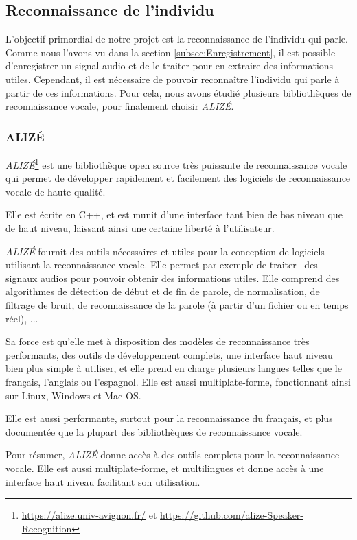 
\subsection{Reconnaissance de l'individu}
\label{subsec:Reconnaissance_individu}

L'objectif primordial de notre projet est la reconnaissance de l'individu qui parle. Comme nous l'avons vu dans la section \ref{subsec:Enregistrement}, il est
possible d'enregistrer un signal audio et de le traiter pour en extraire des informations utiles. Cependant, il est nécessaire de pouvoir reconnaître
l'individu qui parle à partir de ces informations. Pour cela, nous avons étudié plusieurs bibliothèques de reconnaissance vocale, pour finalement choisir
\textit{ALIZÉ}.


\subsubsection{ALIZÉ}
\textit{ALIZÉ}\footnote{\url{https://alize.univ-avignon.fr/} et \url{https://github.com/alize-Speaker-Recognition}} est une bibliothèque open source très
puissante de reconnaissance vocale qui permet de développer rapidement et facilement des logiciels de reconnaissance vocale de haute qualité.

Elle est écrite en C++, et est munit d'une interface tant bien de bas niveau que de haut niveau, laissant ainsi une certaine liberté à l'utilisateur.


\textit{ALIZÉ} fournit des outils nécessaires et utiles pour la conception de logiciels utilisant la reconnaissance vocale. Elle permet par exemple de traiter \
des signaux audios pour pouvoir obtenir des informations utiles. Elle comprend des algorithmes de détection de début et de fin de parole, de normalisation, de
filtrage de bruit, de reconnaissance de la parole (à partir d'un fichier ou en temps réel), ...

Sa force est qu'elle met à disposition des modèles de reconnaissance très performants, des outils de développement complets, une interface haut niveau bien
plus simple à utiliser, et elle prend en charge plusieurs langues telles que le français, l'anglais ou l'espagnol. Elle est aussi multiplate-forme,
fonctionnant ainsi sur Linux, Windows et Mac OS.

Elle est aussi performante, surtout pour la reconnaissance du français, et plus documentée que la plupart des bibliothèques de reconnaissance vocale.

Pour résumer, \textit{ALIZÉ} donne accès à des outils complets pour la reconnaissance vocale. Elle est aussi multiplate-forme, et multilingues et donne accès
à une interface haut niveau facilitant son utilisation.

